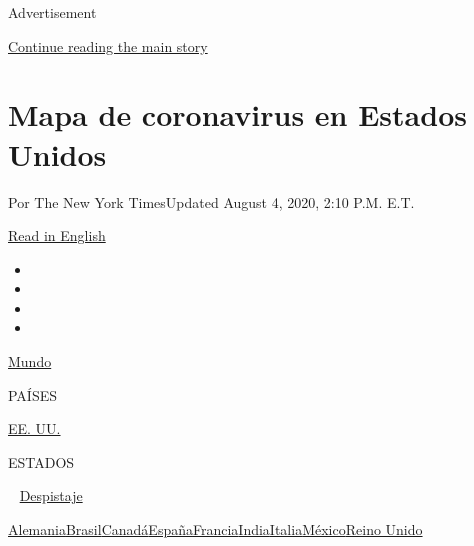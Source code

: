 Advertisement

\protect\hyperlink{after-top}{Continue reading the main story}

\hypertarget{mapa-de-coronavirus-en-estados-unidos}{%
\section{Mapa de coronavirus en Estados
Unidos}\label{mapa-de-coronavirus-en-estados-unidos}}

Por The New York TimesUpdated August 4, 2020, 2:10 P.M. E.T.

\href{https://www.nytimes3xbfgragh.onion/interactive/2020/us/coronavirus-us-cases.html}{Read
in English}

\begin{itemize}
\item
\item
\item
\item
\end{itemize}

\href{https://www.nytimes3xbfgragh.onion/interactive/2020/world/coronavirus-maps.html}{Mundo}~

PAÍSES

\textbar{}
\href{https://www.nytimes3xbfgragh.onion/es/interactive/2020/espanol/mundo/coronavirus-en-estados-unidos.html}{EE.
UU.}~

ESTADOS

~
\href{https://www.nytimes3xbfgragh.onion/interactive/2020/us/coronavirus-testing.html}{Despistaje}

\href{https://www.nytimes3xbfgragh.onion/interactive/2020/world/europe/germany-coronavirus-cases.html}{Alemania}\href{https://www.nytimes3xbfgragh.onion/interactive/2020/world/americas/brazil-coronavirus-cases.html}{Brasil}\href{https://www.nytimes3xbfgragh.onion/interactive/2020/world/canada/canada-coronavirus-cases.html}{Canadá}\href{https://www.nytimes3xbfgragh.onion/interactive/2020/world/europe/spain-coronavirus-cases.html}{España}\href{https://www.nytimes3xbfgragh.onion/interactive/2020/world/europe/france-coronavirus-cases.html}{Francia}\href{https://www.nytimes3xbfgragh.onion/interactive/2020/world/asia/india-coronavirus-cases.html}{India}\href{https://www.nytimes3xbfgragh.onion/interactive/2020/world/europe/italy-coronavirus-cases.html}{Italia}\href{https://www.nytimes3xbfgragh.onion/es/interactive/2020/espanol/america-latina/coronavirus-en-mexico.html}{México}\href{https://www.nytimes3xbfgragh.onion/interactive/2020/world/europe/united-kingdom-coronavirus-cases.html}{Reino
Unido}

